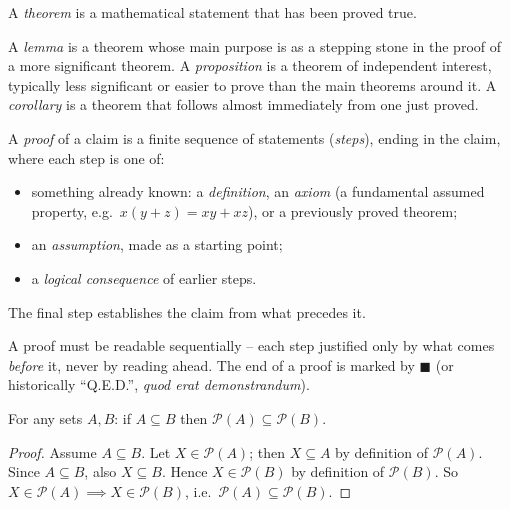 \documentclass[11pt]{article}
\begin{document}
\begin{definition}[Theorem]
A \emph{theorem} is a mathematical statement that has been proved true.
\end{definition}

\begin{definition}
A \emph{lemma} is a theorem whose main purpose is as a stepping stone in the proof of a more significant theorem. A \emph{proposition} is a theorem of independent interest, typically less significant or easier to prove than the main theorems around it. A \emph{corollary} is a theorem that follows almost immediately from one just proved.
\end{definition}

\begin{definition}[Proof]
A \emph{proof} of a claim is a finite sequence of statements (\emph{steps}), ending in the claim, where each step is one of:
\begin{itemize}
    \item something already known: a \emph{definition}, an \emph{axiom} (a fundamental assumed property, e.g.\ $x(y+z)=xy+xz$), or a previously proved theorem;
    \item an \emph{assumption}, made as a starting point;
    \item a \emph{logical consequence} of earlier steps.
\end{itemize}
The final step establishes the claim from what precedes it.
\end{definition}

\begin{note}[Verifiability]
A proof must be readable sequentially -- each step justified only by what comes \emph{before} it, never by reading ahead. The end of a proof is marked by $\blacksquare$ (or historically ``Q.E.D.'', \emph{quod erat demonstrandum}).
\end{note}

\begin{theorem}
For any sets $A, B$: if $A \subseteq B$ then $\mathcal{P}(A) \subseteq \mathcal{P}(B)$.
\end{theorem}
\begin{proof}
Assume $A \subseteq B$. Let $X \in \mathcal{P}(A)$; then $X \subseteq A$ by definition of $\mathcal{P}(A)$. Since $A \subseteq B$, also $X \subseteq B$. Hence $X \in \mathcal{P}(B)$ by definition of $\mathcal{P}(B)$. So $X \in \mathcal{P}(A) \implies X \in \mathcal{P}(B)$, i.e.\ $\mathcal{P}(A) \subseteq \mathcal{P}(B)$.
\end{proof}
\end{document}
